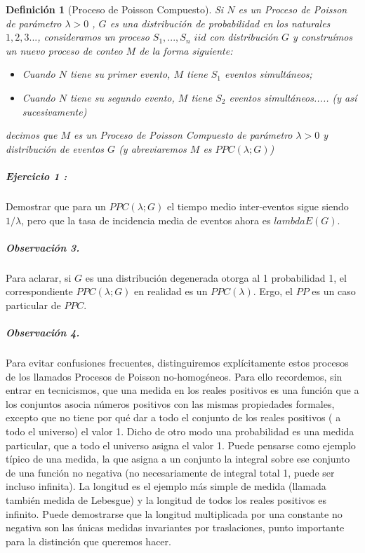 \documentclass[
  oneside]{article}
\newtheorem{definition}{Definición}[section]
\begin{document}
\begin{definition}[Proceso de Poisson Compuesto]\label{def:2}
Si $N$ es un Proceso de Poisson de parámetro $\lambda>0$ , $G$ es una distribución de probabilidad en los naturales $1,2,3...$, consideramos un proceso $S_1,...,S_n$ $iid$ con distribución $G$ y construímos un nuevo proceso de conteo $M$ de la forma siguiente:
\begin{itemize}
\item Cuando $N$ tiene su primer evento, $M$ tiene $S_1$ eventos simultáneos;
\item Cuando $N$ tiene su segundo evento, $M$ tiene $S_2$ eventos simultáneos..... (y así sucesivamente)
\end{itemize}
decimos que $M$ es un Proceso de Poisson Compuesto de parámetro $\lambda>0$ y distribución de eventos $G$ (y abreviaremos $M$ es $PPC(\lambda;G)$)
\end{definition}

\hypertarget{ejercicio-1}{%
\subparagraph{Ejercicio 1 :}\label{ejercicio-1}}

Demostrar que para un \(PPC(\lambda;G)\) el tiempo medio inter-eventos
sigue siendo \(1/\lambda\), pero que la tasa de incidencia media de
eventos ahora es \(lambda E(G)\).

\hypertarget{observaciuxf3n-3.}{%
\subparagraph{Observación 3.}\label{observaciuxf3n-3.}}

Para aclarar, si \(G\) es una distribución degenerada otorga al 1
probabilidad 1, el correspondiente \(PPC(\lambda;G)\) en realidad es un
\(PPC(\lambda)\). Ergo, el \(PP\) es un caso particular de \(PPC\).

\hypertarget{observaciuxf3n-4.}{%
\subparagraph{Observación 4.}\label{observaciuxf3n-4.}}

Para evitar confusiones frecuentes, distinguiremos explícitamente estos
procesos de los llamados Procesos de Poisson no-homogéneos. Para ello
recordemos, sin entrar en tecnicismos, que una medida en los reales
positivos es una función que a los conjuntos asocia números positivos
con las mismas propiedades formales, excepto que no tiene por qué dar a
todo el conjunto de los reales positivos ( a todo el universo) el valor
1. Dicho de otro modo una probabilidad es una medida particular, que a
todo el universo asigna el valor 1. Puede pensarse como ejemplo típico
de una medida, la que asigna a un conjunto la integral sobre ese
conjunto de una función no negativa (no necesariamente de integral total
1, puede ser incluso infinita). La longitud es el ejemplo más simple de
medida (llamada también medida de Lebesgue) y la longitud de todos los
reales positivos es infinito. Puede demostrarse que la longitud
multiplicada por una constante no negativa son las únicas medidas
invariantes por traslaciones, punto importante para la distinción que
queremos hacer.
\end{document}
